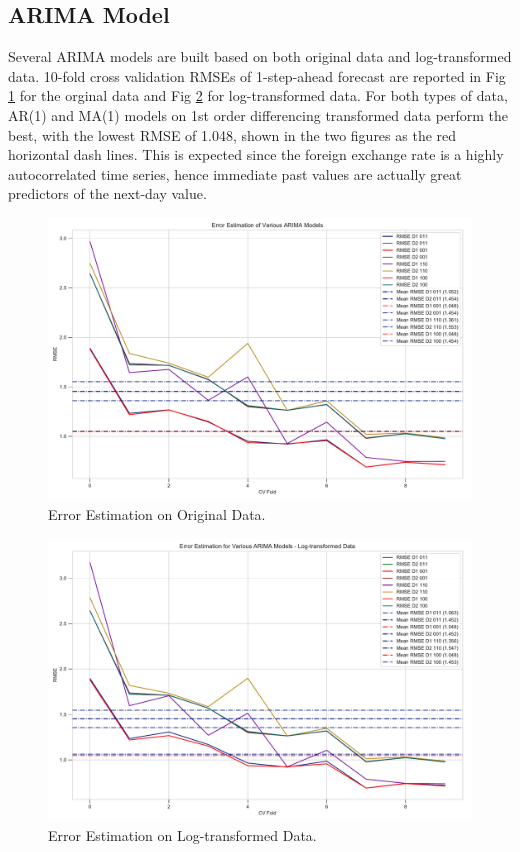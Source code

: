 \documentclass[]{article}
\begin{document}
\subsection{ARIMA Model}
Several ARIMA models are built based on both original data and log-transformed data. 10-fold cross validation RMSEs of 1-step-ahead forecast are reported in Fig \ref{fig:error_estimation_1} for the orginal data and Fig \ref{fig:error_estimation_2} for log-transformed data. For both types of data, AR(1) and MA(1) models on 1st order differencing transformed data perform the best, with the lowest RMSE of 1.048, shown in the two figures as the red horizontal dash lines. This is expected since the foreign exchange rate is a highly autocorrelated time series, hence immediate past values are actually great predictors of the next-day value.

%
\begin{figure}[hbtp]
	\centering
	\includegraphics[width=1\columnwidth]{../Figures/error_estimation_1.pdf}
	\caption{Error Estimation on Original Data.}
	\label{fig:error_estimation_1}
\end{figure}
%
%
\begin{figure}[hbtp]
	\centering
	\includegraphics[width=1\columnwidth]{../Figures/error_estimation_2.pdf}
	\caption{Error Estimation on Log-transformed Data.}
	\label{fig:error_estimation_2}
\end{figure}
%
\end{document}
